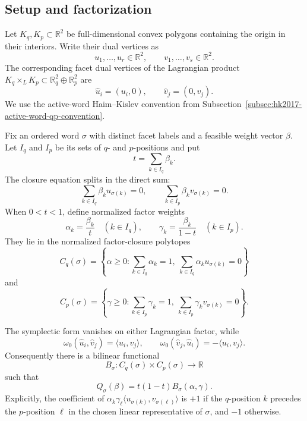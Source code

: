 \begin{unverified}

\subsection{Setup and factorization}
\label{subsec:product-qp-six-facet-setup}

Let \(K_q,K_p\subset\mathbb R^2\) be full-dimensional convex polygons
containing the origin in their interiors.  Write their dual vertices as
\[
  u_1,\ldots,u_r\in\mathbb R^2,
  \qquad
  v_1,\ldots,v_s\in\mathbb R^2.
\]
The corresponding facet dual vertices of the Lagrangian product
\(K_q\times_LK_p\subset\mathbb R_q^2\oplus\mathbb R_p^2\) are
\[
  \widehat u_i=(u_i,0),
  \qquad
  \widehat v_j=(0,v_j).
\]
We use the active-word Haim--Kislev convention from
Subsection~\ref{subsec:hk2017-active-word-qp-convention}.

Fix an ordered word \(\sigma\) with distinct facet labels and a feasible
weight vector \(\beta\).  Let \(I_q\) and \(I_p\) be its sets of \(q\)- and
\(p\)-positions and put
\[
  t=\sum_{k\in I_q}\beta_k.
\]
The closure equation splits in the direct sum:
\[
  \sum_{k\in I_q}\beta_k u_{\sigma(k)}=0,
  \qquad
  \sum_{k\in I_p}\beta_k v_{\sigma(k)}=0.
\]
When \(0<t<1\), define normalized factor weights
\[
  \alpha_k=\frac{\beta_k}{t}\quad(k\in I_q),
  \qquad
  \gamma_k=\frac{\beta_k}{1-t}\quad(k\in I_p).
\]
They lie in the normalized factor-closure polytopes
\[
  C_q(\sigma)=
  \left\{
    \alpha\geq0:
    \sum_{k\in I_q}\alpha_k=1,\
    \sum_{k\in I_q}\alpha_k u_{\sigma(k)}=0
  \right\}
\]
and
\[
  C_p(\sigma)=
  \left\{
    \gamma\geq0:
    \sum_{k\in I_p}\gamma_k=1,\
    \sum_{k\in I_p}\gamma_k v_{\sigma(k)}=0
  \right\}.
\]

The symplectic form vanishes on either Lagrangian factor, while
\[
  \omega_0(\widehat u_i,\widehat v_j)=\langle u_i,v_j\rangle,
  \qquad
  \omega_0(\widehat v_j,\widehat u_i)=-\langle u_i,v_j\rangle.
\]
Consequently there is a bilinear functional
\[
  B_\sigma:C_q(\sigma)\times C_p(\sigma)\longrightarrow\mathbb R
\]
such that
\begin{equation}
  Q_\sigma(\beta)
  =
  t(1-t)B_\sigma(\alpha,\gamma).
  \label{eq:product-qp-factorization}
\end{equation}
Explicitly, the coefficient of
\(\alpha_k\gamma_\ell\langle u_{\sigma(k)},v_{\sigma(\ell)}\rangle\)
is \(+1\) if the \(q\)-position \(k\) precedes the \(p\)-position \(\ell\)
in the chosen linear representative of \(\sigma\), and \(-1\) otherwise.


\end{unverified}
